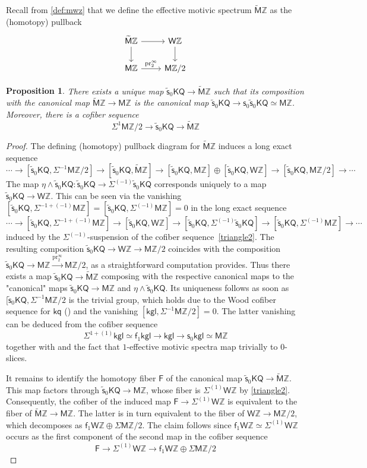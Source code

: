 \documentclass[11pt,hyp,english]{article}
\newcommand{\F}{\mathsf{F}}
\newcommand{\Z}{\mathbb{Z}}
\newcommand{\kgl}{\mathsf{kgl}}
\newcommand{\KQ}{\mathsf{KQ}}
\newcommand{\kq}{\mathsf{kq}}
\newcommand{\MZ}{\mathsf{M}\Z}
\newcommand{\HZ}{\mathsf{M}\Z}
\newcommand{\cHZ}{\wt{{\mathsf{M}}}{\Z}}
\newcommand{\HWZ}{\mathsf{W}\Z}
\newcommand{\wt}[1]{\widetilde{#1}}
\newcommand{\pr}{\operatorname{pr}}
\newcommand{\s}{\mathsf{s}}
\newcommand{\vs}{\tilde{\mathsf{s}}}
\newcommand{\f}{\mathsf{f}}
\let\smash=\wedge
\newtheorem{proposition}[theorem]{Proposition}
\theoremstyle{definition}
\begin{document}
Recall from \eqref{def:mwz} that we define the effective motivic spectrum $\cHZ$ as the 
(homotopy) pullback
\[ 
\begin{tikzcd}
    \cHZ \ar[r] \ar[d] & \HWZ \ar[d] \\
    \MZ \ar[r,"\pr^\infty_2"] & \MZ/2
\end{tikzcd}
\]

\begin{proposition}\label{prop:chz}
There exists a unique map $\vs_0\KQ\to \cHZ$ such that its composition with the canonical map 
$\cHZ\to \MZ$ is the canonical map $\vs_0\KQ\to \s_0\vs_0\KQ\simeq \MZ$.
Moreover, there is a cofiber sequence
\begin{equation}
\Sigma^{1}\HZ/2 \to \vs_0\KQ  \to \cHZ \label{triangle}
\end{equation}
\end{proposition}

\begin{proof}
The defining (homotopy) pullback diagram for $\cHZ$ induces a long exact sequence
\[ \dotsm \to [\vs_0\KQ, \Sigma^{-1}\MZ/2] \to [\vs_0\KQ, \cHZ] \to [\vs_0\KQ, \MZ]\oplus [\vs_0\KQ, \HWZ] \to   [\vs_0\KQ, \MZ/2] \to \dotsm \]
The map $\eta\smash \vs_0\KQ\colon \vs_0\KQ \to \Sigma^{(-1)}\vs_0\KQ$ corresponds uniquely to a map $\vs_0\KQ\to \HWZ$.
This can be seen via the vanishing $[\vs_0\KQ,\Sigma^{-1+(-1)}\MZ] = [\vs_0\KQ,\Sigma^{(-1)}\MZ]=0$
in the long exact sequence
\[ \dotsm \to [\vs_0\KQ,\Sigma^{-1+(-1)}\MZ] \to [\vs_0\KQ,\HWZ]\to [\vs_0\KQ,\Sigma^{(-1)}\vs_0\KQ] \to [\vs_0\KQ,\Sigma^{(-1)}\MZ] \to \dotsm \]
induced by the $\Sigma^{(-1)}$-suspension of the cofiber sequence~\eqref{triangle2}.
The resulting composition $\vs_0\KQ\to \HWZ\to \MZ/2$ coincides with the composition $\vs_0\KQ \to \MZ \xrightarrow{\pr^\infty_2}\MZ/2$, as a straightforward computation provides.
Thus there exists a map $\vs_0\KQ \to \cHZ$ composing with the respective canonical maps to the "canonical" maps $\vs_0\KQ\to \MZ$ and $\eta\smash \vs_0\KQ$. 
Its uniqueness follows as soon as $[\vs_0\KQ,\Sigma^{-1}\MZ/2$ is the trivial group, 
which holds due to the Wood cofiber sequence for $\kq$ () and the vanishing $[\kgl,\Sigma^{-1}\MZ/2]=0$.
The latter vanishing can be deduced from the cofiber sequence
\[ \Sigma^{1+(1)}\kgl \simeq \f_1\kgl \to \kgl \to \s_0\kgl \simeq \MZ\]
together with  and 
the fact that $1$-effective motivic spectra map trivially to $0$-slices.

It remains to identify the homotopy fiber $\F$ of the canonical map $\vs_0\KQ \to \cHZ$. This map factors through $\vs_0\KQ \to \MZ$, whose fiber is $\Sigma^{(1)}\HWZ$ by \eqref{triangle2}. Consequently, the cofiber of the induced map $\F \to \Sigma^{(1)}\HWZ$ is equivalent to the fiber of $\cHZ \to \MZ$. The latter is in turn equivalent to the fiber of $\HWZ \to \MZ/2$, which decomposes as $\f_1\HWZ \oplus \Sigma \MZ/2$. The claim follows since $\f_1\HWZ\simeq \Sigma^{(1)}\HWZ$ occurs as the first component of the second map in the cofiber sequence
\[ \F\to \Sigma^{(1)}\HWZ \to \f_1\HWZ\oplus \Sigma\MZ/2\]
\end{proof}
\end{document}
